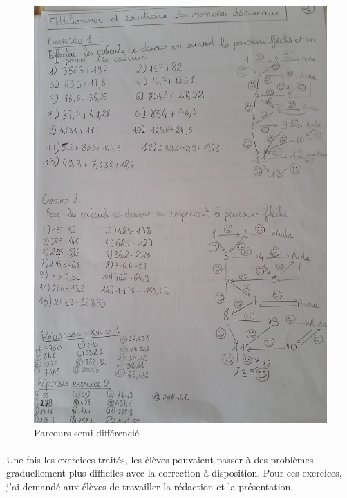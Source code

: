 \begin{figure}[!h]
	\centering
	\includegraphics[scale=0.2]{img/parcours_decimaux.jpg}
	\caption{Parcours semi-différencié}
\end{figure}

\paragraph{}Une fois les exercices traités, les élèves pouvaient passer à des problèmes graduellement plus difficiles avec la correction à disposition. Pour ces exercices, j'ai demandé aux élèves de travailler la rédaction et la présentation.

